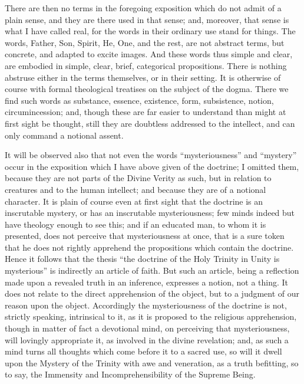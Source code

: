 There are then no terms in the foregoing exposition which do not
admit of a plain sense, and they are there used in that sense; and,
moreover, that sense is what I have called real, for the words in
their ordinary use stand for things. The words, Father, Son, Spirit,
He, One, and the rest, are not abstract terms, but concrete, and
adapted to excite images. And these words thus simple and clear,
are embodied in simple, clear, brief, categorical propositions. There
is nothing abstruse either in the terms themselves, or in their
setting. It is otherwise of course with formal theological treatises
on the subject of the dogma. There we find such words as substance,
essence, existence, form, subsistence, notion, circumincession; and,
though these are far easier to understand than might at first sight be
thought, still they are doubtless addressed to the intellect, and can
only command a notional assent.

It will be observed also that not even the words
``mysteriousness'' and ``mystery'' occur in the
exposition which I have above given of the doctrine; I omitted them,
because they are not parts of the Divine Verity as such, but in
relation to creatures and to the human intellect; and because they are
of a notional character. It is plain of course even at first sight
that the doctrine is an inscrutable mystery, or has an inscrutable
mysteriousness; few minds indeed but have theology enough to see this;
and if an educated man, to whom it is presented, does not perceive
that mysteriousness at once, that is a sure token that he does not
rightly apprehend the propositions which contain the doctrine. Hence
it follows that the thesis ``the doctrine of the Holy Trinity in
Unity is mysterious'' is indirectly an article of faith. But such
an article, being a reflection made upon a revealed truth in an
inference, expresses a notion, not a thing. It does not relate to the
direct apprehension of the object, but to a judgment of our reason
upon the object. Accordingly the mysteriousness of the doctrine is
not, strictly speaking, intrinsical to it, as it is proposed to
the religious apprehension, though in matter of fact a devotional
mind, on perceiving that mysteriousness, will lovingly appropriate it,
as involved in the divine revelation; and, as such a mind turns all
thoughts which come before it to a sacred use, so will it dwell upon
the Mystery of the Trinity with awe and veneration, as a truth
befitting, so to say, the Immensity and Incomprehensibility of the
Supreme Being.

